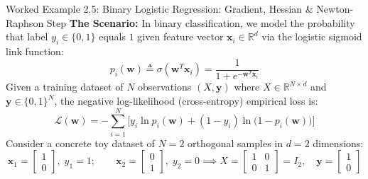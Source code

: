 \begin{examplebox}[breakable]{Worked Example 2.5: Binary Logistic Regression: Gradient, Hessian \& Newton-Raphson Step}
\label{ex:w02_logistic_regression_calculus}
\textbf{The Scenario:}
In binary classification, we model the probability that label $y_i \in \{0, 1\}$ equals $1$ given feature vector $\mathbf{x}_i \in \mathbb{R}^d$ via the logistic sigmoid link function:
\begin{equation*}
p_i(\mathbf{w}) \triangleq \sigma(\mathbf{w}^T \mathbf{x}_i) = \frac{1}{1 + e^{-\mathbf{w}^T \mathbf{x}_i}}
\end{equation*}
Given a training dataset of $N$ observations $(X, \mathbf{y})$ where $X \in \mathbb{R}^{N \times d}$ and $\mathbf{y} \in \{0, 1\}^N$, the negative log-likelihood (cross-entropy) empirical loss is:
\begin{equation*}
\mathcal{L}(\mathbf{w}) = -\sum_{i=1}^N \Big[ y_i \ln p_i(\mathbf{w}) + (1 - y_i) \ln\big(1 - p_i(\mathbf{w})\big) \Big]
\end{equation*}
Consider a concrete toy dataset of $N = 2$ orthogonal samples in $d = 2$ dimensions:
\begin{equation*}
\mathbf{x}_1 = \begin{bmatrix} 1 \\ 0 \end{bmatrix}, \; y_1 = 1; \qquad \mathbf{x}_2 = \begin{bmatrix} 0 \\ 1 \end{bmatrix}, \; y_2 = 0 \implies X = \begin{bmatrix} 1 & 0 \\ 0 & 1 \end{bmatrix} = I_2, \quad \mathbf{y} = \begin{bmatrix} 1 \\ 0 \end{bmatrix}
\end{equation*}


\end{examplebox}
